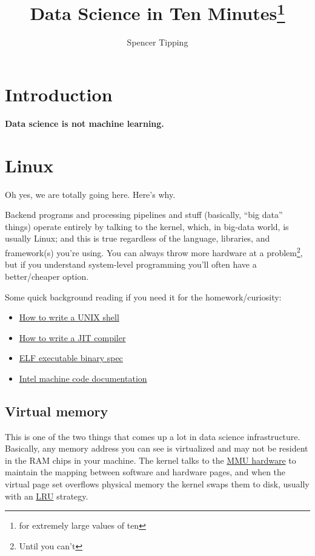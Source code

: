 \documentclass{article}
\title{Data Science in Ten Minutes\footnote{for extremely large values of ten}}
\author{Spencer Tipping}
\newcommand{\lnk}[2]{\href{#1}{\textcolor[rgb]{1.0,0.0,0.0}{#2}}}
\begin{document}
  \maketitle
  \tableofcontents

  \section{Introduction}
  {\bf Data science is not machine learning.}

  \newpage
  \section{Linux}
  Oh yes, we are totally going here. Here's why.

  Backend programs and processing pipelines and stuff (basically, ``big data''
  things) operate entirely by talking to the kernel, which, in big-data world,
  is usually Linux; and this is true regardless of the language, libraries, and
  framework(s) you're using. You can always throw more hardware at a
  problem\footnote{Until you can't}, but if you understand system-level
  programming you'll often have a better/cheaper option.

  Some quick background reading if you need it for the homework/curiosity:

  \begin{itemize}
    \item \lnk{https://github.com/spencertipping/shell-tutorial}
              {How to write a UNIX shell}
    \item \lnk{https://github.com/spencertipping/jit-tutorial}
              {How to write a JIT compiler}
    \item \lnk{http://manpages.ubuntu.com/manpages/xenial/man5/elf.5.html}
              {ELF executable binary spec}
    \item \lnk{https://www.intel.com/content/dam/www/public/us/en/documents/manuals/64-ia-32-architectures-software-developer-instruction-set-reference-manual-325383.pdf}
              {Intel machine code documentation}
  \end{itemize}

  \subsection{Virtual memory}
  This is one of the two things that comes up a lot in data science
  infrastructure. Basically, any memory address you can see is virtualized and
  may not be resident in the RAM chips in your machine. The kernel talks to the
  \lnk{https://en.wikipedia.org/wiki/Memory_management_unit}{MMU hardware} to
  maintain the mapping between software and hardware pages, and when the virtual
  page set overflows physical memory the kernel swaps them to disk, usually with
  an \lnk{https://en.wikipedia.org/wiki/Cache_replacement_policies}{LRU}
  strategy.
\end{document}
